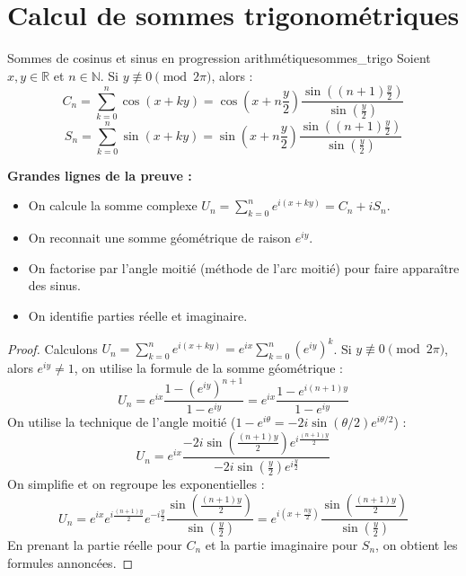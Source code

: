 \documentclass{prepacours}
\begin{document}
\section{Calcul de sommes trigonométriques}

\begin{proposition}{Sommes de cosinus et sinus en progression arithmétique}{sommes_trigo}
    Soient $x, y \in \mathbb{R}$ et $n \in \mathbb{N}$. Si $y \not\equiv 0 \pmod{2\pi}$, alors :
    \[ C_n = \sum_{k=0}^n \cos(x+ky) = \cos\left(x + n\frac{y}{2}\right) \frac{\sin\left((n+1)\frac{y}{2}\right)}{\sin\left(\frac{y}{2}\right)} \]
    \[ S_n = \sum_{k=0}^n \sin(x+ky) = \sin\left(x + n\frac{y}{2}\right) \frac{\sin\left((n+1)\frac{y}{2}\right)}{\sin\left(\frac{y}{2}\right)} \]
\end{proposition}

\noindent \textbf{Grandes lignes de la preuve :}
\begin{itemize}
    \item On calcule la somme complexe $U_n = \sum_{k=0}^n e^{i(x+ky)} = C_n + i S_n$.
    \item On reconnait une somme géométrique de raison $e^{iy}$.
    \item On factorise par l'angle moitié (méthode de l'arc moitié) pour faire apparaître des sinus.
    \item On identifie parties réelle et imaginaire.
\end{itemize}

\begin{proof}
    Calculons $U_n = \sum_{k=0}^n e^{i(x+ky)} = e^{ix} \sum_{k=0}^n (e^{iy})^k$.
    Si $y \not\equiv 0 \pmod{2\pi}$, alors $e^{iy} \neq 1$, on utilise la formule de la somme géométrique :
    \[ U_n = e^{ix} \frac{1 - (e^{iy})^{n+1}}{1 - e^{iy}} = e^{ix} \frac{1 - e^{i(n+1)y}}{1 - e^{iy}} \]
    On utilise la technique de l'angle moitié ($1-e^{i\theta} = -2i\sin(\theta/2)e^{i\theta/2}$) :
    \[ U_n = e^{ix} \frac{-2i\sin\left(\frac{(n+1)y}{2}\right) e^{i\frac{(n+1)y}{2}} }{-2i\sin\left(\frac{y}{2}\right) e^{i\frac{y}{2}} } \]
    On simplifie et on regroupe les exponentielles :
    \[ U_n = e^{ix} e^{i\frac{(n+1)y}{2}} e^{-i\frac{y}{2}} \frac{\sin\left(\frac{(n+1)y}{2}\right)}{\sin\left(\frac{y}{2}\right)} = e^{i\left(x + \frac{ny}{2}\right)} \frac{\sin\left(\frac{(n+1)y}{2}\right)}{\sin\left(\frac{y}{2}\right)} \]
    En prenant la partie réelle pour $C_n$ et la partie imaginaire pour $S_n$, on obtient les formules annoncées.
\end{proof}
\end{document}
